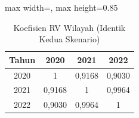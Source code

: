 \begin{table}[H]
\centering
\caption{Koefisien RV Wilayah (Identik Kedua Skenario)} \label{tab:samplerv_w}
\begin{adjustbox}{max width=\textwidth, max height=0.85\textheight}
\begin{tabular}{|c|c|c|c|}
\hline
\textbf{Tahun} & \textbf{2020} & \textbf{2021} & \textbf{2022} \\
\hline
2020 & 1 & 0,9168 & 0,9030 \\
2021 & 0,9168 & 1 & 0,9964 \\
2022 & 0,9030 & 0,9964 & 1 \\
\hline
\end{tabular}
\end{adjustbox}
\end{table}